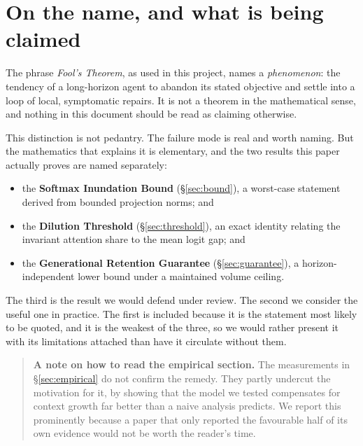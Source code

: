 \documentclass[11pt,a4paper]{article}
\theoremstyle{plain}
\theoremstyle{definition}
\theoremstyle{remark}
\begin{document}
\begin{abstract}
The paper is deliberately two-sided. It argues that volume is the variable a
system designer can control, and it documents the evidence that the model was
already partly controlling it on its own.
\end{abstract}

\section{On the name, and what is being claimed}
\label{sec:name}

The phrase \emph{Fool's Theorem}, as used in this project, names a
\emph{phenomenon}: the tendency of a long-horizon agent to abandon its stated
objective and settle into a loop of local, symptomatic repairs. It is not a
theorem in the mathematical sense, and nothing in this document should be read
as claiming otherwise.

This distinction is not pedantry. The failure mode is real and worth naming.
But the mathematics that explains it is elementary, and the two results this
paper actually proves are named separately:

\begin{itemize}[leftmargin=*]
  \item the \textbf{Softmax Inundation Bound} (\S\ref{sec:bound}), a worst-case
        statement derived from bounded projection norms; and
  \item the \textbf{Dilution Threshold} (\S\ref{sec:threshold}), an exact
        identity relating the invariant attention share to the mean logit gap;
        and
  \item the \textbf{Generational Retention Guarantee} (\S\ref{sec:guarantee}),
        a horizon-independent lower bound under a maintained volume ceiling.
\end{itemize}

The third is the result we would defend under review. The second we consider the
useful one in practice. The first is included because it is the statement most
likely to be quoted, and it is the weakest of the three, so we would rather
present it with its limitations attached than have it circulate without them.

\begin{quote}
\textbf{A note on how to read the empirical section.} The measurements in
\S\ref{sec:empirical} do not confirm the remedy. They partly undercut the
motivation for it, by showing that the model we tested compensates for context
growth far better than a naive analysis predicts. We report this prominently
because a paper that only reported the favourable half of its own evidence would
not be worth the reader's time.
\end{quote}
\end{document}
